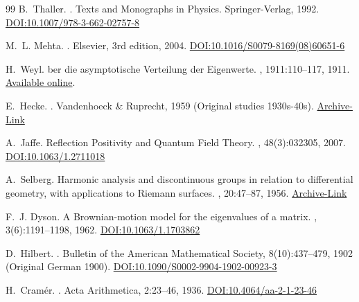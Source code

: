 \documentclass{article}
\numberwithin{equation}{section}
\theoremstyle{plain}
\theoremstyle{definition}
\theoremstyle{remark}
\begin{document}
\begin{thebibliography}{99}
B.~Thaller.
.
\newblock Texts and Monographs in Physics. Springer-Verlag, 1992.
\href{https://doi.org/10.1007/978-3-662-02757-8}{DOI:10.1007/978-3-662-02757-8}

M.~L. Mehta.
.
\newblock Elsevier, 3rd edition, 2004.
\href{https://doi.org/10.1016/S0079-8169(08)60651-6}{DOI:10.1016/S0079-8169(08)60651-6}

H.~Weyl.
ber die asymptotische Verteilung der Eigenwerte.
, 1911:110--117, 1911.
\newblock \href{http://resolver.sub.uni-goettingen.de/purl?GDZPPN002502690}{Available online}.

E.~Hecke.
.
\newblock Vandenhoeck \& Ruprecht, 1959 (Original studies 1930s-40s).
\href{https://archive.org/details/mathematischewer0000heck}{Archive-Link}

A.~Jaffe.
\newblock Reflection Positivity and Quantum Field Theory.
, 48(3):032305, 2007.
\href{https://doi.org/10.1063/1.2711018}{DOI:10.1063/1.2711018}

A.~Selberg.
\newblock Harmonic analysis and discontinuous groups in relation to differential geometry, with applications to Riemann surfaces.
, 20:47--87, 1956.
\href{https://archive.org/details/selberg-1956}{Archive-Link}

F.~J. Dyson.
\newblock A Brownian-motion model for the eigenvalues of a matrix.
, 3(6):1191--1198, 1962.
\href{https://doi.org/10.1063/1.1703862}{DOI:10.1063/1.1703862}

D.~Hilbert.
.
\newblock Bulletin of the American Mathematical Society, 8(10):437--479, 1902 (Original German 1900).
\href{https://doi.org/10.1090/S0002-9904-1902-00923-3}{DOI:10.1090/S0002-9904-1902-00923-3}

H.~Cram{\'e}r.
.
\newblock Acta Arithmetica, 2:23--46, 1936.
\href{https://doi.org/10.4064/aa-2-1-23-46}{DOI:10.4064/aa-2-1-23-46}


\end{thebibliography}
\end{document}
